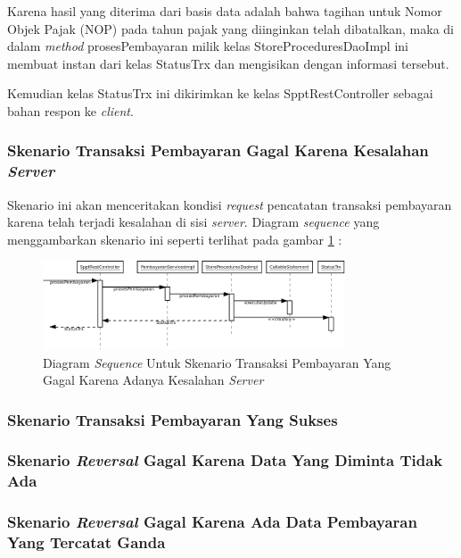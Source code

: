 \documentclass[pdftex,12pt, oneside]{article}
\begin{document}
Karena hasil yang diterima dari basis data adalah bahwa tagihan untuk Nomor Objek Pajak (NOP) pada tahun pajak yang diinginkan telah dibatalkan, maka di dalam \textit{method} prosesPembayaran milik kelas StoreProceduresDaoImpl ini membuat instan dari kelas StatusTrx dan mengisikan dengan informasi tersebut. 

Kemudian kelas StatusTrx ini dikirimkan ke kelas SpptRestController sebagai bahan respon ke \textit{client}.

\subsubsection{Skenario Transaksi Pembayaran Gagal Karena Kesalahan \textit{Server}}

Skenario ini akan menceritakan kondisi \textit{request} pencatatan transaksi pembayaran karena telah terjadi kesalahan di sisi \textit{server}. Diagram \textit{sequence} yang menggambarkan skenario ini seperti terlihat pada gambar \ref{fig:uml-seq-trx-db-error} :

\begin{figure}[H]
  \centering
  \includegraphics[width=0.8\textwidth]{./resources/diagram/uml-seq-trx-db-error}
  \caption{Diagram \textit{Sequence} Untuk Skenario Transaksi Pembayaran Yang Gagal Karena Adanya Kesalahan \textit{Server}}
  \label{fig:uml-seq-trx-db-error}
\end{figure}



\subsubsection{Skenario Transaksi Pembayaran Yang Sukses}
\subsubsection{Skenario \textit{Reversal} Gagal Karena Data Yang Diminta Tidak Ada}
\subsubsection{Skenario \textit{Reversal} Gagal Karena Ada Data Pembayaran Yang Tercatat Ganda}
\end{document}
